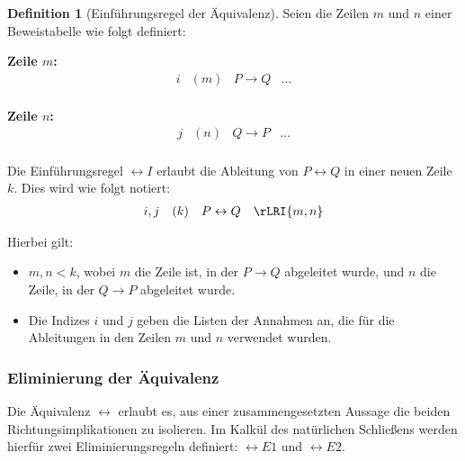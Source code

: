 \documentclass{book}
\theoremstyle{plain}
\theoremstyle{remark}
\theoremstyle{definition}
\newtheorem{definition}{Definition}[section]
\begin{document}
\begin{definition}[Einführungsregel der Äquivalenz]
Seien die Zeilen \( m \) und \( n \) einer Beweistabelle wie folgt definiert:

\textbf{Zeile \( m \):}
\[
\begin{array}{llll}
    i & (m) & P \rightarrow Q & \dots \\
\end{array}
\]

\textbf{Zeile \( n \):}
\[
\begin{array}{llll}
    j & (n) & Q \rightarrow P & \dots \\
\end{array}
\]

Die Einführungsregel \(\leftrightarrow I\) erlaubt die Ableitung von \( P \leftrightarrow Q \) in einer neuen Zeile \( k \). Dies wird wie folgt notiert:
\[
\begin{array}{llll}
    i, j & (k) & P \leftrightarrow Q & \rLRI{m,n} \\
\end{array}
\]

Hierbei gilt:
\begin{itemize}
    \item \(m, n < k\), wobei \(m\) die Zeile ist, in der \(P \rightarrow Q\) abgeleitet wurde, und \(n\) die Zeile, in der \(Q \rightarrow P\) abgeleitet wurde.
    \item Die Indizes \( i \) und \( j \) geben die Listen der Annahmen an, die für die Ableitungen in den Zeilen \( m \) und \( n \) verwendet wurden.
\end{itemize}

\end{definition}

\subsubsection{Eliminierung der Äquivalenz}
\label{rule:LRE1}\label{rule:LRE2}
Die Äquivalenz \(\leftrightarrow\) erlaubt es, aus einer zusammengesetzten Aussage die beiden Richtungsimplikationen zu isolieren. Im Kalkül des natürlichen Schließens werden hierfür zwei Eliminierungsregeln definiert: \(\leftrightarrow E1\) und \(\leftrightarrow E2\).
\end{document}
